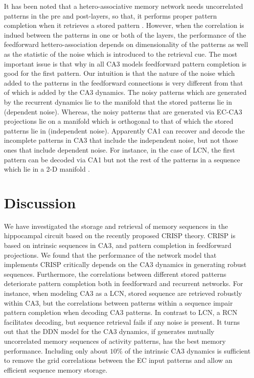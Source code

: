 \documentclass[utf8]{frontiersSCNS} %
\begin{document}
It has been noted that a hetero-associative memory network needs uncorrelated patterns in the pre and post-layers, so that, it performs proper pattern completion when it retrieves a stored pattern \citep{willshaw1969non, neher2015memory}. 
%
However, when the correlation is indued between the patterns in one or both of the layers, the performance of the feedforward hettero-association depends on dimensionality of the patterns as well as the statistic of the noise which is introduced to the retrieval cue.   
%        
The most important issue is that why in all CA3 models feedforward pattern completion is good for the first pattern.      
%     
Our intuition is that the nature of the noise which added to the patterns in the feedforward connections is very different from that of which is added by the CA3 dynamics. The noisy patterns which are generated by the recurrent dynamics lie to the manifold that the stored patterns lie in (dependent noise). Whereas, the noisy patterns that are generated via EC-CA3 projections lie on a manifold which is orthogonal to that of which the stored patterns lie in (independent noise). Apparently CA1 can recover and decode the incomplete patterns in CA3 that include the independent noise, but not those ones that include dependent noise. For instance, in the case of LCN, the first pattern can be decoded via CA1 but not the rest of the patterns in a sequence which lie in a 2-D manifold .      
%        


\section{Discussion}

We have investigated the storage and retrieval of memory sequences in the hippocampal circuit based on the recently proposed CRISP theory. CRISP is based on intrinsic sequences in CA3, and pattern completion in feedforward projections. We found that the performance of the network model that implements CRISP critically depends on the CA3 dynamics in generating robust sequences. Furthermore, the correlations between different stored patterns deteriorate pattern completion both in feedforward and recurrent networks. For instance, when modeling CA3 as a LCN, stored sequence are retrieved robustly within CA3, but the correlations between patterns within a sequence impair pattern completion when decoding CA3 patterns. In contrast to LCN, a RCN facilitates decoding, but sequence retrieval fails if any noise is present.
%
It turns out that the DDN model for the CA3 dynamics, if generates mutually uncorrelated memory sequences of activity patterns, has the best memory performance. 
%
Including only about $10\%$ of the intrinsic CA3 dynamics is sufficient to remove the grid correlations between the EC input patterns and allow an efficient sequence memory storage.   
%
\end{document}
